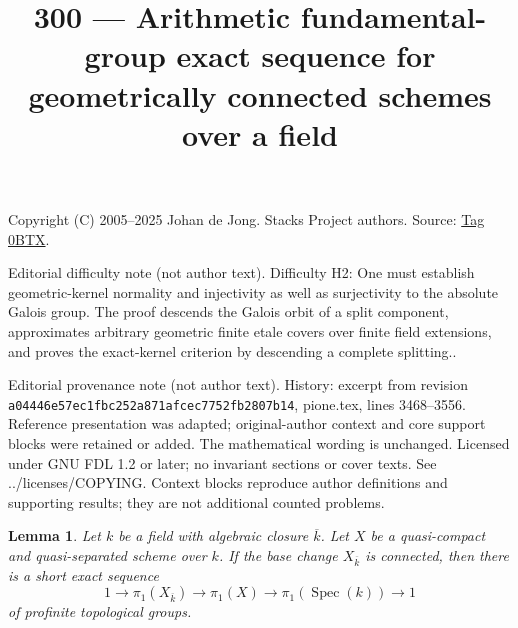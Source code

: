 \documentclass{amsart}
\theoremstyle{plain}
\newtheorem{lemma}[subsection]{Lemma}
\theoremstyle{definition}
\theoremstyle{remark}
\numberwithin{equation}{subsection}
\def\Spec{\mathop{\mathrm{Spec}}}
\begin{document}
\title[Stacks Project, Tag 0BTX]{300 --- Arithmetic fundamental-group exact sequence for geometrically connected schemes over a field}
\maketitle
\noindent Copyright (C) 2005--2025 Johan de Jong. Stacks Project authors. Source: \href{https://stacks.math.columbia.edu/tag/0BTX}{Tag 0BTX}.

\noindent Editorial difficulty note (not author text). Difficulty H2: One must establish geometric-kernel normality and injectivity as well as surjectivity to the absolute Galois group. The proof descends the Galois orbit of a split component, approximates arbitrary geometric finite etale covers over finite field extensions, and proves the exact-kernel criterion by descending a complete splitting..

\noindent Editorial provenance note (not author text). History: excerpt from revision \texttt{a0444\allowbreak 6e57e\allowbreak c1fbc\allowbreak 252a8\allowbreak 71afc\allowbreak ec775\allowbreak 2fb28\allowbreak 07b14}, pione.tex, lines 3468--3556. Reference presentation was adapted; original-author context and core support blocks were retained or added. The mathematical wording is unchanged. Licensed under GNU FDL 1.2 or later; no invariant sections or cover texts. See ../licenses/COPYING. Context blocks reproduce author definitions and supporting results; they are not additional counted problems.

\begin{lemma}
\label{lemma-ses-field}
Let $k$ be a field with algebraic closure $\overline{k}$.
Let $X$ be a quasi-compact and quasi-separated scheme over $k$.
If the base change $X_{\overline{k}}$ is connected, then
there is a short exact sequence
$$
1 \to \pi_1(X_{\overline{k}}) \to \pi_1(X) \to \pi_1(\Spec(k)) \to 1
$$
of profinite topological groups.
\end{lemma}
\end{document}
